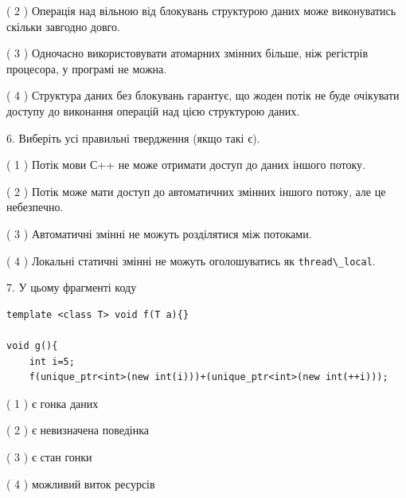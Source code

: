 \documentclass[12pt, ukrainian]{article}
\def\code#1{\Verb!#1!}
\begin{document}
\begin {large}
{( 2 ) Операція над вільною від блокувань структурою даних може виконуватись скільки завгодно довго.%

( 3 ) Одночасно використовувати атомарних змінних більше, ніж регістрів процесора, у програмі не можна.%

( 4 ) Структура даних без блокувань гарантує, що жоден потік не буде очікувати доступу до виконання операцій над цією структурою даних.%
\newpage



\vspace{5mm}
6. Виберіть усі правильні твердження (якщо такі є).\par
\vspace{2mm}

( 1 ) Потік мови С++ не може отримати доступ до даних іншого потоку.%

( 2 ) Потік може мати доступ до автоматичних змінних іншого потоку, але це небезпечно.%

( 3 ) Автоматичні змінні не можуть розділятися між потоками.%

( 4 ) Локальні статичні змінні не можуть оголошуватись як \code{thread\_local}.%


\vspace{5mm}
7. У цьому фрагменті коду
\begin{verbatim}
template <class T> void f(T a){}

void g(){
    int i=5;
    f(unique_ptr<int>(new int(i)))+(unique_ptr<int>(new int(++i)));
\end{verbatim}
( 1 ) є гонка даних%

( 2 ) є невизначена поведінка%

( 3 ) є стан гонки%

( 4 ) можливий виток ресурсів%
}
\end {large}
\end{document}
